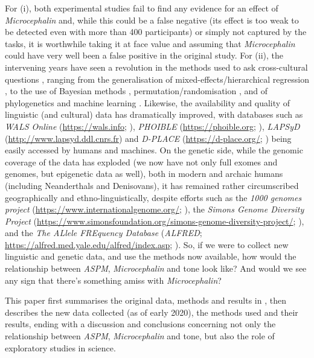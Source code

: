 \documentclass[twoside,onecolumn]{article}
\begin{document}
For (i), both experimental studies \citep{wong_plosone_2012,wong_sciadv_2020} fail to find any evidence for an effect of \textit{Microcephalin} and, while this could be a false negative (its effect is too weak to be detected even with more than 400 participants) or simply not captured by the tasks, it is worthwhile taking it at face value and assuming that \textit{Microcephalin} could have very well been a false positive in the original \citet{dediu_ladd_2007} study.
For (ii), the intervening years have seen a revolution in the methods used to ask cross-cultural questions \citep{ladd_correlational_2015}, ranging from the generalisation of mixed-effects/hierarchical regression \citep{jaeger_mixed_2011,gelman_data_2006}, to the use of Bayesian methods \citep{blasi_human_2019,mcelreath_statistical_2020}, permutation/randomisation \citep{janssen_randomization_2006}, and of phylogenetics \citep{bouckaert_mapping_2012} and machine learning \citep{her_statistical_2020}.
Likewise, the availability and quality of linguistic (and cultural) data has dramatically improved, with databases such as \textit{WALS Online} (\url{https://wals.info}; \citealp{dryer_wals_2013}), \textit{PHOIBLE} (\url{https://phoible.org}; \citealp{moran_phoible_2014}), \textit{LAPSyD} (\url{http://www.lapsyd.ddl.cnrs.fr}) and \textit{D-PLACE} (\url{https://d-place.org/}; \citealp{kirby_dplace_2016}) being easily accessed by humans and machines.
On the genetic side, while the genomic coverage of the data has exploded (we now have not only full exomes and genomes, but epigenetic data as well), both in modern and archaic humans (including Neanderthals and Denisovans), it has remained rather circumscribed geographically and ethno-linguistically, despite efforts such as the \textit{1000 genomes project} (\url{https://www.internationalgenome.org/}; \citealp{the_1000_genomes_2015}), the \textit{Simons Genome Diversity Project} (\url{https://www.simonsfoundation.org/simons-genome-diversity-project/}; \citealp{mallick_simons_2016}), and the \textit{The ALlele FREquency Database} (\textit{ALFRED}; \url{https://alfred.med.yale.edu/alfred/index.asp}; \citealp{rajeevan_alfred_2003}).
So, if we were to collect new linguistic and genetic data, and use the methods now available, how would the relationship between \textit{ASPM}, \textit{Microcephalin} and tone look like?
And would we see any sign that there's something amiss with \textit{Microcephalin}?

This paper first summarises the original data, methods and results in \citet{dediu_ladd_2007}, then describes the new data collected (as of early 2020), the methods used and their results, ending with a discussion and conclusions concerning not only the relationship between \textit{ASPM}, \textit{Microcephalin} and tone, but also the role of exploratory studies in science.
\end{document}
